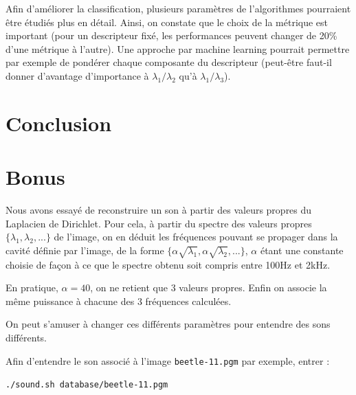 \documentclass[a4paper,10pt]{article} %
\theoremstyle{definition} %
\begin{document}
Afin d'améliorer la classification, plusieurs paramètres de l'algorithmes pourraient être étudiés plus en détail. Ainsi, on constate que le choix de la métrique est important (pour un descripteur fixé, les performances peuvent changer de 20\% d'une métrique à l'autre). Une approche par machine learning pourrait permettre par exemple de pondérer chaque composante du descripteur (peut-être faut-il donner d'avantage d'importance à $\lambda_1/\lambda_2$ qu'à $\lambda_1/\lambda_3$).



\section{Conclusion}



\section*{Bonus}

Nous avons essayé de reconstruire un son à partir des valeurs propres du Laplacien de Dirichlet. Pour cela, à partir du spectre des valeurs propres $\{\lambda_1, \lambda_2, ...\}$ de l'image, on en déduit les fréquences pouvant se propager dans la cavité définie par l'image, de la forme $\{\alpha \sqrt{\lambda_1}, \alpha \sqrt{\lambda_2}, ...\}$, $\alpha$ étant une constante choisie de façon à ce que le spectre obtenu soit compris entre 100Hz et 2kHz.

En pratique, $\alpha = 40$, on ne retient que 3 valeurs propres. Enfin on associe la même puissance à chacune des 3 fréquences calculées.

On peut s'amuser à changer ces différents paramètres pour entendre des sons différents.

Afin d'entendre le son associé à l'image \texttt{beetle-11.pgm} par exemple, entrer : 
\begin{center}
  \texttt{./sound.sh database/beetle-11.pgm}
\end{center}
\end{document}
